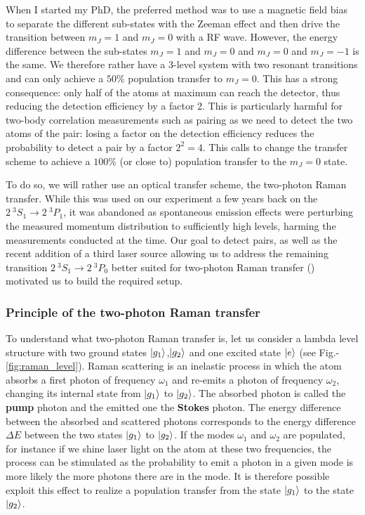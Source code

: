 When I started my PhD, the preferred method was to use a magnetic field bias to separate the different sub-states with the Zeeman effect and then drive the transition between $m_J=1$ and $m_J=0$ with a RF wave. However, the energy difference between the sub-states $m_J=1$ and $m_J=0$ and $m_J=0$ and $m_J=-1$ is the same. We therefore rather have a 3-level system with two resonant transitions and can only achieve a $50\%$ population transfer to $m_J=0$. This has a strong consequence: only half of the atoms at maximum can reach the detector, thus reducing the detection efficiency by a factor 2. This is particularly harmful for two-body correlation measurements such as \kmk pairing as we need to detect the two atoms of the pair: losing a factor on the detection efficiency reduces the probability to detect a \kmk pair by a factor $2^2=4$. This calls to change the transfer scheme to achieve a $100\%$ (or close to) population transfer to the $m_J=0$ state.

To do so, we will rather use an optical transfer scheme, the two-photon Raman transfer. While this was used on our experiment a few years back on the $2 \ ^3 S_1 \rightarrow 2 \ ^3 P_1$, it was abandoned as spontaneous emission effects were perturbing the measured momentum distribution to sufficiently high levels, harming the measurements conducted at the time. Our goal to detect \kmk pairs, as well as the recent addition of a third laser source allowing us to address the remaining transition $2 \ ^3 S_1 \rightarrow 2 \ ^3 P_0$ better suited for two-photon Raman transfer () motivated us to build the required setup. 

\subsubsection{Principle of the two-photon Raman transfer}


To understand what two-photon Raman transfer is, let us consider a lambda level structure with two ground states $\ket{g_1}$,$\ket{g_2}$ and one excited state $\ket{e}$ (see Fig.-\ref{fig:raman_level}). Raman scattering is an inelastic process in which the atom absorbs a first photon of frequency $\omega_1$ and re-emits a photon of frequency $\omega_2$, changing its internal state from $\ket{g_1}$ to $\ket{g_2}$. The absorbed photon is called the \textbf{pump} photon and the emitted one the \textbf{Stokes} photon. The energy difference between the absorbed and scattered photons corresponds to the energy difference $\Delta E$ between the two states $\ket{g_1}$ to $\ket{g_2}$. If the modes $\omega_1$ and $\omega_2$ are populated, for instance if we shine laser light on the atom at these two frequencies, the process can be stimulated as the probability to emit a photon in a given mode is more likely the more photons there are in the mode. It is therefore possible exploit this effect to realize a population transfer from the state $\ket{g_1}$ to the state $\ket{g_2}$.


